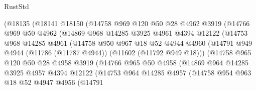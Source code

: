 \begin{lexlean}{RustStd}
\begin{coremodule}
                  (@18135
                    (@18141
                      @18150
                      (@14758
                        @969
                        @120
                        @50
                        @28
                        @4962
                        @3919
                        (@14766
                          @969
                          @50
                          @4962
                          (@14869
                            @968
                            @14285
                            @3925
                            @4961
                            @4394
                            @12122
                            (@14753
                              @968
                              @14285
                              @4961
                              (@14758
                                @950
                                @967
                                @18
                                @52
                                @4944
                                @4960
                                (@14791
                                  @949
                                  @4944
                                  (@11786 (@11787 @4944))
                                  (@11602 (@11792 @949 @18)))
                                (@14758
                                  @965
                                  @120
                                  @50
                                  @28
                                  @4958
                                  @3919
                                  (@14766
                                    @965
                                    @50
                                    @4958
                                    (@14869
                                      @964
                                      @14285
                                      @3925
                                      @4957
                                      @4394
                                      @12122
                                      (@14753
                                        @964
                                        @14285
                                        @4957
                                        (@14758
                                          @954
                                          @963
                                          @18
                                          @52
                                          @4947
                                          @4956
                                          (@14791

\end{coremodule}
\end{lexlean}
